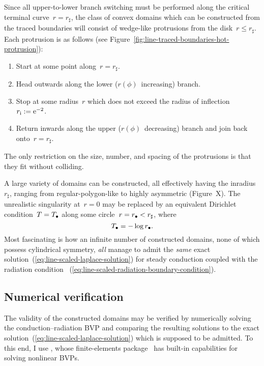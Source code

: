 Since all upper-to-lower branch switching must be performed
along the critical terminal curve~$r = r_\sharp$,
the class of convex domains which can be constructed
from the traced boundaries
will consist of wedge-like protrusions from the disk~$r \le r_\sharp$.
Each protrusion is as follows
(see Figure~\ref{fig:line-traced-boundaries-hot-protrusion}):
\begin{enumerate}
  \item
    Start at some point along~$r = r_\sharp$.
  \item
    Head outwards along the lower ($r (\phi)$~increasing) branch.
  \item
    Stop at some radius~$r$ which does not exceed
    the radius of inflection~$r_{\mathrm{i}} := \mathrm{e}^{-2}$.
  \item
    Return inwards along the upper ($r (\phi)$~decreasing) branch
    and join back onto~$r = r_\sharp$.
\end{enumerate}
The only restriction on the size, number, and spacing of the protrusions
is that they fit without colliding.

A large variety of domains can be constructed,
all effectively having the inradius~$r_\sharp$,
ranging from regular-polygon-like to highly asymmetric
(Figure~X). %
The unrealistic singularity at~$r = 0$
may be replaced by an equivalent Dirichlet condition~$T = T_\bullet$
along some circle~$r = r_\bullet < r_\sharp$,
where
\begin{equation}
  T_\bullet = -\log r_\bullet.
  \label{eq:line-scaled-equivalent-dirichlet-relation}
\end{equation}
Most fascinating is how an infinite number of constructed domains,
none of which possess cylindrical symmetry,
\emph{all} manage to admit
the \emph{same} exact solution~(\ref{eq:line-scaled-laplace-solution})
for steady conduction coupled with the radiation condition~%
  (\ref{eq:line-scaled-radiation-boundary-condition}).

\subsection{Numerical verification}
\label{sec:line.convex.verification}

The validity of the constructed domains may be verified
by numerically solving the conduction--radiation BVP
and comparing the resulting solutions
to the exact solution~(\ref{eq:line-scaled-laplace-solution})
which is supposed to be admitted.
To this end, I use ,
whose finite-elements package~
has built-in capabilities for solving nonlinear BVPs.


